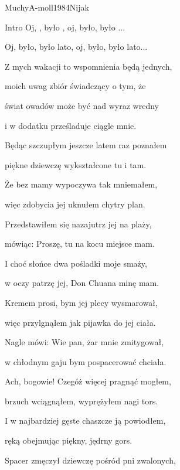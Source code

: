 \begin{song}{Muchy}{A-moll}{1984}{Nijak}{}{}

  \begin{SBBracket}{Intro}
    Oj, , było , oj, było, było ...

    Oj, było, było lato, oj, było, było lato...
  \end{SBBracket}

  \begin{SBVerse}
    Z mych wakacji to wspomnienia będą jednych,

    moich uwag zbiór świadczący o tym, że

    świat owadów może być nad wyraz wredny

    i w dodatku prześladuje ciągle mnie.
  \end{SBVerse}
  \begin{SBVerse}
    Będąc szczupłym jeszcze latem raz poznałem

    piękne dziewczę wykształcone tu i tam.

    Że bez mamy wypoczywa tak mniemałem,

    więc zdobycia jej uknułem chytry plan.
  \end{SBVerse}
  \begin{SBVerse}
    Przedstawiłem się nazajutrz jej na plaży,

    mówiąc: Proszę, tu na kocu miejsce mam.

    I choć słońce dwa pośladki moje smaży,

    w oczy patrzę jej, Don Chuana minę mam.
  \end{SBVerse}
  \begin{SBVerse}
    Kremem prosi, bym jej plecy wysmarował,

    więc przylgnąłem jak pijawka do jej ciała.

    Nagle mówi: Wie pan, żar mnie zmitygował,

    w chłodnym gaju bym pospacerować chciała.
  \end{SBVerse}
  \begin{SBVerse}
    Ach, bogowie! Czegóż więcej pragnąć mogłem,

    brzuch wciągnąłem, wyprężyłem nagi tors.

    I w najbardziej gęste chaszcze ją powiodłem,

    ręką obejmując piękny, jędrny gors.
  \end{SBVerse}
  \begin{SBVerse}
    Spacer zmęczył dziewczę pośród pni zwalonych,


\end{SBVerse}
\end{song}
